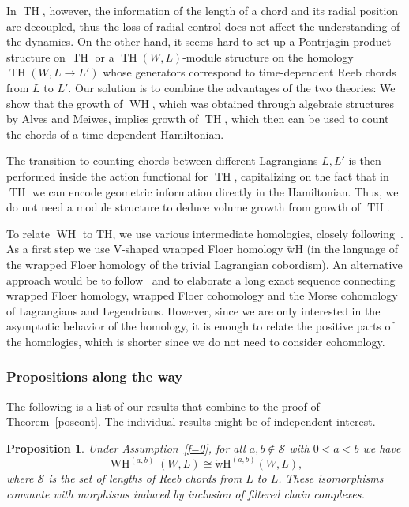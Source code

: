 \documentclass{amsart}
\newcommand{\Scal}{{\mathcal{S}}}
\renewcommand{\TH}{\operatorname{TH}}
\newcommand{\WslantH}{\operatorname{WH}}
\newcommand{\WcheckH}{\operatorname{\check wH}}
\newtheorem{proposition}{Proposition}[section]
\theoremstyle{definition}
\theoremstyle{remark}
\numberwithin{equation}{section}
\begin{document}
In $\TH$, however, the information of the length of a chord and its radial position are decoupled, thus the loss of radial control does not affect the understanding of the dynamics. On the other hand, it seems hard to set up a Pontrjagin product structure on $\TH$ or a $\TH(W,L)$-module structure on the homology $\TH(W,L\to L')$ whose generators correspond to time-dependent Reeb chords from $L$ to $L'$. Our solution is to combine the advantages of the two theories: We show that the growth of $\WslantH$, which was obtained through algebraic structures by Alves and Meiwes, implies growth of $\TH$, which then can be used to count the chords of a time-dependent Hamiltonian. 

The transition to counting chords between different Lagrangians $L, L'$ is then performed inside the action functional for $\TH$, capitalizing on the fact that in $\TH$ we can encode geometric information directly in the Hamiltonian. Thus, we do not need a module structure to deduce volume growth from growth of $\TH$.  

To relate $\WslantH$ to TH, we use various intermediate homologies, closely following~\cite{CFO10}. As a first step we use V-shaped wrapped Floer homology $\WcheckH$ (in the language of~\cite{CO17} the wrapped Floer homology of the trivial Lagrangian cobordism). An alternative approach would be to follow~\cite{CFO10} and to elaborate a long exact sequence connecting wrapped Floer homology, wrapped Floer cohomology and the Morse cohomology of Lagrangians and Legendrians. However, since we are only interested in the asymptotic behavior of the homology, it is enough to relate the positive parts of the homologies, which is shorter since we do not need to consider cohomology. 

\subsubsection*{Propositions along the way} The following is a list of our results that combine to the proof of Theorem~\ref{poscont}. The individual results might be of independent interest.

\begin{proposition}\label{acuteischeck}
	Under Assumption~\ref{f=0}, for all $a,b\notin\Scal$ with $0<a<b$ we have
	\begin{equation*}
		\WslantH^{(a,b)}(W,L)\cong\WcheckH^{(a,b)}(W,L),
	\end{equation*}
	where $\Scal$ is the set of lengths of Reeb chords from $L$ to $L$. These isomorphisms commute with morphisms induced by inclusion of filtered chain complexes.
\end{proposition}
\end{document}
